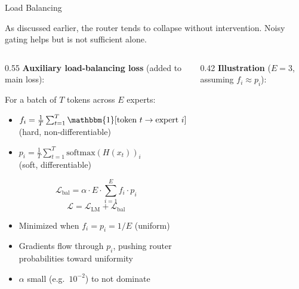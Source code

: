 \begin{frame}{Load Balancing}

  As discussed earlier, the router tends to collapse without intervention. Noisy gating helps but is not sufficient alone.

  \begin{columns}
    \begin{column}{0.55\textwidth}
      \textbf{Auxiliary load-balancing loss} (added to main loss):

      \vspace{0.2em}
      For a batch of $T$ tokens across $E$ experts:
      \begin{itemize}
        \item $f_i = \frac{1}{T} \sum_{t=1}^{T} \mathbbm{1}[\text{token } t \to \text{expert } i]$ \\ (hard, non-differentiable)
        \item $p_i = \frac{1}{T} \sum_{t=1}^{T} \mathrm{softmax}(H(x_t))_i$ \\ (soft, differentiable)
      \end{itemize}

      \[
        \mathcal{L}_{\text{bal}} = \alpha \cdot E \cdot \sum_{i=1}^{E} f_i \cdot p_i
      \]
      \[
        \mathcal{L} = \mathcal{L}_{\text{LM}} + \mathcal{L}_{\text{bal}}
      \]

      \begin{itemize}
        \item Minimized when $f_i = p_i = 1/E$ (uniform)
        \item Gradients flow through $p_i$, pushing router probabilities toward uniformity
        \item $\alpha$ small (e.g.\ $10^{-2}$) to not dominate
      \end{itemize}
    \end{column}
    \begin{column}{0.42\textwidth}
      \textbf{Illustration} ($E{=}3$, assuming $f_i \approx p_i$):


\end{column}
\end{columns}
\end{frame}
